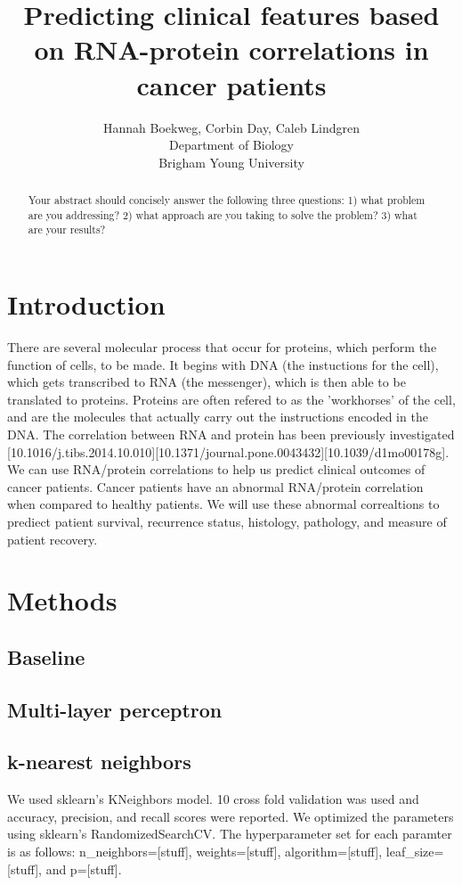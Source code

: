 \documentclass{article}
\title{Predicting clinical features based on RNA-protein correlations in cancer patients}
\author{Hannah Boekweg, Corbin Day, Caleb Lindgren \\
Department of Biology\\
Brigham Young University}
\begin{document}
\maketitle

\begin{abstract}
  Your abstract should concisely answer the following three questions: 1) what problem are you addressing? 2) what approach are you taking to solve the problem? 3) what are your results?
\end{abstract}

\section{Introduction}
There are several molecular process that occur for proteins, which perform the function of cells, to be made. 
It begins with DNA (the instuctions for the cell), which gets transcribed to RNA (the messenger), which is then able to be translated to proteins. 
Proteins are often refered to as the 'workhorses' of the cell, and are the molecules that actually carry out the instructions encoded in the DNA.
The correlation between RNA and protein has been previously investigated [10.1016/j.tibs.2014.10.010][10.1371/journal.pone.0043432][10.1039/d1mo00178g]. 
We can use RNA/protein correlations to help us predict clinical outcomes of cancer patients. Cancer patients have an abnormal RNA/protein correlation when compared to healthy patients. 
We will use these abnormal correaltions to prediect patient survival, recurrence status, histology, pathology, and measure of patient recovery. 


\section{Methods}

\subsection{Baseline}

\subsection{Multi-layer perceptron}

\subsection{k-nearest neighbors}
We used sklearn's KNeighbors model. 10 cross fold validation was used and accuracy, precision, and recall scores were reported. 
We optimized the parameters using sklearn's RandomizedSearchCV.
The hyperparameter set for each paramter is as follows: n_neighbors=[stuff], weights=[stuff], algorithm=[stuff], leaf_size=[stuff], and p=[stuff]. 
\end{document}
